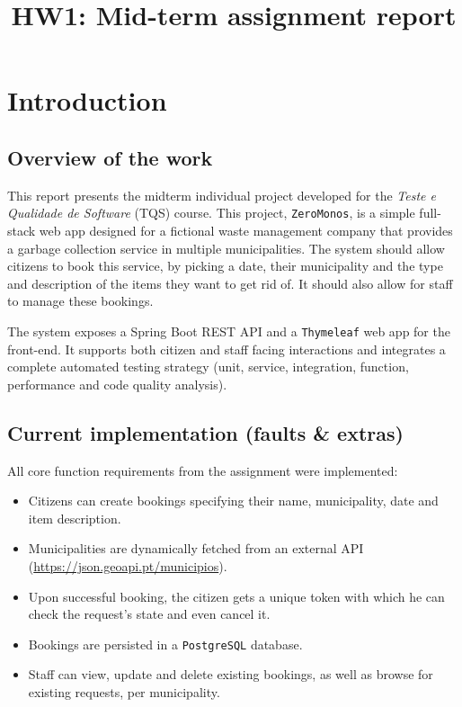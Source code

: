 \documentclass[code,math]{relatorio-deti}
\title{HW1: Mid-term assignment report}
\begin{document}
\maketitle

\tableofcontents
\clearpage


\chapter{Introduction}
\section{Overview of the work}

This report presents the midterm individual project developed for the \textit{Teste e Qualidade de Software} (TQS) course. This project, \texttt{ZeroMonos}, is a simple full-stack web app designed for a fictional waste management company that provides a garbage collection service in multiple municipalities. The system should allow citizens to book this service, by picking a date, their municipality and the type and description of the items they want to get rid of. It should also allow for staff to manage these bookings.

The system exposes a Spring Boot REST API and a \texttt{Thymeleaf} web app for the front-end. It supports both citizen and staff facing interactions and integrates a complete automated testing strategy (unit, service, integration, function, performance and code quality analysis).

\section{Current implementation (faults \& extras)}

All core function requirements from the assignment were implemented:

\begin{itemize}
    \item Citizens can create bookings specifying their name, municipality, date and item description.
    \item Municipalities are dynamically fetched from an external API (\href{https://json.geoapi.pt/municipios}{https://json.geoapi.\linebreak pt/municipios}).
    \item Upon successful booking, the citizen gets a unique token with which he can check the request's state and even cancel it.
    \item Bookings are persisted in a \texttt{PostgreSQL} database.
    \item Staff can view, update and delete existing bookings, as well as browse for existing requests, per municipality.
\end{itemize}
\end{document}
